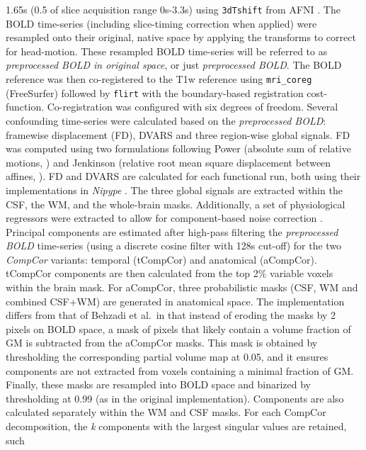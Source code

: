 \documentclass[
]{article}
\begin{document}
\begin{description}
1.65s (0.5 of slice acquisition range 0s-3.3s) using \texttt{3dTshift}
from AFNI \citep[RRID:SCR\_005927]{afni}. The BOLD time-series
(including slice-timing correction when applied) were resampled onto
their original, native space by applying the transforms to correct for
head-motion. These resampled BOLD time-series will be referred to as
\emph{preprocessed BOLD in original space}, or just \emph{preprocessed
BOLD}. The BOLD reference was then co-registered to the T1w reference
using \texttt{mri\_coreg} (FreeSurfer) followed by \texttt{flirt}
\citep[FSL 6.0.5.1:57b01774,][]{flirt} with the boundary-based
registration \citep{bbr} cost-function. Co-registration was configured
with six degrees of freedom. Several confounding time-series were
calculated based on the \emph{preprocessed BOLD}: framewise displacement
(FD), DVARS and three region-wise global signals. FD was computed using
two formulations following Power (absolute sum of relative motions,
\citet{power_fd_dvars}) and Jenkinson (relative root mean square
displacement between affines, \citet{mcflirt}). FD and DVARS are
calculated for each functional run, both using their implementations in
\emph{Nipype} \citep[following the definitions by][]{power_fd_dvars}.
The three global signals are extracted within the CSF, the WM, and the
whole-brain masks. Additionally, a set of physiological regressors were
extracted to allow for component-based noise correction
\citep[\emph{CompCor},][]{compcor}. Principal components are estimated
after high-pass filtering the \emph{preprocessed BOLD} time-series
(using a discrete cosine filter with 128s cut-off) for the two
\emph{CompCor} variants: temporal (tCompCor) and anatomical (aCompCor).
tCompCor components are then calculated from the top 2\% variable voxels
within the brain mask. For aCompCor, three probabilistic masks (CSF, WM
and combined CSF+WM) are generated in anatomical space. The
implementation differs from that of Behzadi et al.~in that instead of
eroding the masks by 2 pixels on BOLD space, a mask of pixels that
likely contain a volume fraction of GM is subtracted from the aCompCor
masks. This mask is obtained by thresholding the corresponding partial
volume map at 0.05, and it ensures components are not extracted from
voxels containing a minimal fraction of GM. Finally, these masks are
resampled into BOLD space and binarized by thresholding at 0.99 (as in
the original implementation). Components are also calculated separately
within the WM and CSF masks. For each CompCor decomposition, the
\emph{k} components with the largest singular values are retained, such

\end{description}
\end{document}
